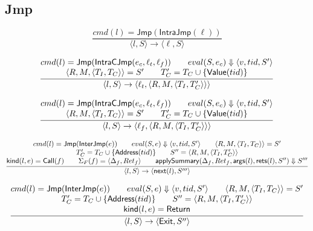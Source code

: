 \documentclass{article}
\newcommand{\step}[4]{\langle #1,#2\rangle \rightarrow \langle #3,#4\rangle}
\newcommand{\nexti}{\mathsf{next}}
\newcommand{\eval}[3]{eval(#1,#2) \Downarrow #3}
\begin{document}
\subsection{Jmp}
\[
\frac{
    cmd(l)=\mathsf{Jmp}(\mathsf{IntraJmp}(\ell))
} { \step{l}{S}{\ell}{S} }
\]

\[
\frac{
    \begin{array}{@{}c@{}}
        cmd(l)=\mathsf{Jmp}(\mathsf{IntraCJmp}(e_c,\ell_t,\ell_f)) \qquad
        \eval{S}{e_c}{\langle v,tid,S'\rangle}\\
        \langle R,M,\langle T_I,T_C\rangle\rangle = S'\qquad
        T_C'=T_C \cup \{\mathsf{Value}(tid)\}
    \end{array}
} { \step{l}{S}{\ell_t}{ \langle R,M,\langle T_I,T_C'\rangle\rangle } }
\]

\[
\frac{
    \begin{array}{@{}c@{}}
        cmd(l)=\mathsf{Jmp}(\mathsf{IntraCJmp}(e_c,\ell_t,\ell_f)) \qquad
        \eval{S}{e_c}{\langle v,tid,S'\rangle}\\
        \langle R,M,\langle T_I,T_C\rangle\rangle = S'\qquad
        T_C'=T_C \cup \{\mathsf{Value}(tid)\}
    \end{array}
} { \step{l}{S}{\ell_f}{ \langle R,M,\langle T_I,T_C'\rangle\rangle } }
\]

\[
\frac{
    \begin{array}{@{}c@{}}
        cmd(l)=\mathsf{Jmp}(\mathsf{InterJmp}(e)) \qquad
        \eval{S}{e}{\langle v, tid, S'\rangle} \qquad
        \langle R,M,\langle T_I,T_C\rangle\rangle = S'\\
        T_C'=T_C \cup \{\mathsf{Address}(tid)\}\qquad
        S''=\langle R,M,\langle T_I,T_C'\rangle\rangle\\
        
        \mathsf{kind}(l,e)=\mathsf{Call}(f)\qquad
        \Sigma_F(f)=\langle \Delta_f,Ret_f\rangle \qquad
        \mathsf{applySummary}(\Delta_f,Ret_f,\mathsf{args}(l),\mathsf{rets}(l),S'')\Downarrow S'''
    \end{array}
} { \step{l}{S}{\nexti(l)}{S'''} }
\]

\[
\frac{
    \begin{array}{@{}c@{}}
        cmd(l)=\mathsf{Jmp}(\mathsf{InterJmp}(e)) \qquad
        \eval{S}{e}{\langle v, tid, S'\rangle} \qquad
        \langle R,M,\langle T_I,T_C\rangle\rangle = S'\\
        T_C'=T_C \cup \{\mathsf{Address}(tid)\}\qquad
        S''=\langle R,M,\langle T_I,T_C'\rangle\rangle\\
        \mathsf{kind}(l,e)=\mathsf{Return}
    \end{array}
} { \step{l}{S}{\mathsf{Exit}}{S''} }
\]
\end{document}
